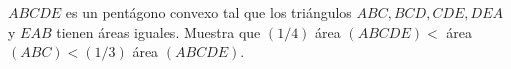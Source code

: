 $ABCDE$ es un pentágono convexo tal que los triángulos $ABC, BCD, CDE, DEA$ y $EAB$ tienen áreas iguales. Muestra que $(1/4)$ área $(ABCDE) <$ área $(ABC) < (1/3)$ área $(ABCDE)$. 